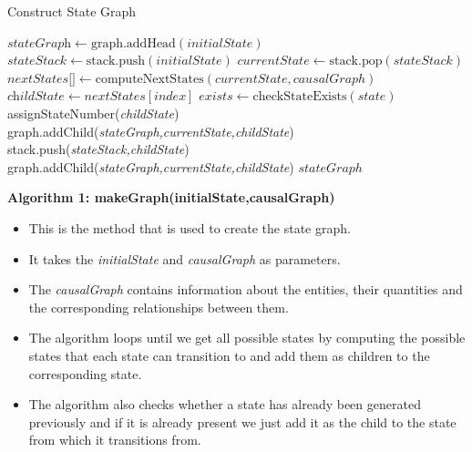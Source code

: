 \documentclass{article}
\begin{document}
\begin{algorithm}[!h]
	\caption{Construct State Graph}\label{stategraph}
	\begin{algorithmic}[1]
		\State $\textit{stateGraph} \gets \text{graph.addHead}(\textit{initialState})$
		\State $\textit{stateStack} \gets \text{stack.push}(\textit{initialState})$
		\State $\textit{currentState} \gets \text{stack.pop}(stateStack)$
		\State $\textit{nextStates[]} \gets \text{computeNextStates}(currentState,causalGraph)$
		\State $\textit{childState} \gets nextStates[index]$
		\State $\textit{exists} \gets \text{checkStateExists}(state)$
		\State assignStateNumber(\textit{childState})
		\State graph.addChild(\textit{stateGraph,currentState,childState})
		\State stack.push(\textit{stateStack,childState})
		\Else 
		\State graph.addChild(\textit{stateGraph,currentState,childState})
		\EndIf
		\EndFor
		\EndWhile
		\State \Return $stateGraph$
		\EndProcedure
	\end{algorithmic}
\end{algorithm}

\textbf{Algorithm 1: makeGraph(initialState,causalGraph)}
\begin{itemize}
	\item This is the method that is used to create the state graph.
	\item It takes the \textit{initialState} and \textit{causalGraph} as parameters.
	\item The \textit{causalGraph} contains information about the entities,  their quantities and the corresponding relationships between them.
	\item The algorithm loops until we get all possible states by computing the possible states that each state can transition to and add them as children to the corresponding state. 
	\item The algorithm also checks whether a state has already been generated previously and if it is already present we just add it as the child to the state from which it transitions from.
\end{itemize}
\end{document}
